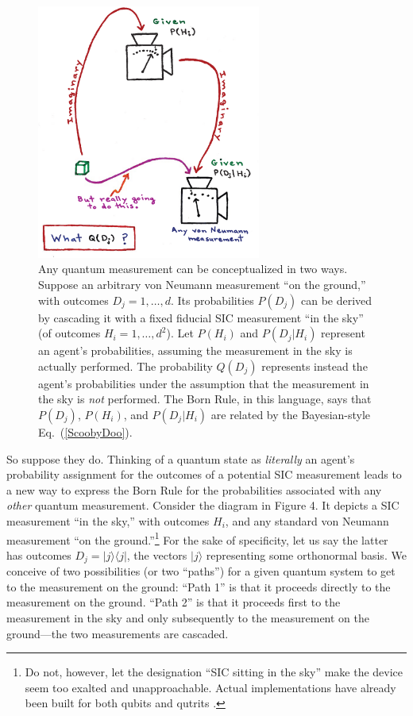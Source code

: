 \begin{figure}
\begin{center}
\includegraphics[height=3.3in]{diagram-new.eps}
\bigskip\caption{\small Any quantum measurement can be conceptualized in two ways.
Suppose an arbitrary von Neumann measurement ``on the ground,'' with outcomes $D_j=1,\ldots,d$. Its probabilities $P(D_j)$ can be derived by cascading it with a fixed fiducial SIC measurement ``in the sky'' (of outcomes $H_i=1,\ldots,d^2$). Let $P(H_i)$ and $P(D_j|H_i)$ represent an agent's probabilities, assuming the measurement in the sky is actually performed. The probability $Q(D_j)$ represents instead the agent's probabilities under the assumption that the measurement in the sky is {\it not\/} performed. The Born Rule, in this language, says that $P(D_j)$, $P(H_i)$, and $P(D_j|H_i)$ are related by the Bayesian-style Eq.~(\ref{ScoobyDoo}).}
\end{center}
\end{figure}

So suppose they do.  Thinking of a quantum state as {\it literally\/} an agent's probability assignment for the outcomes of a potential SIC measurement leads to a new way to express the Born Rule for the probabilities associated with any {\it other\/} quantum measurement.  Consider the diagram in Figure 4.  It depicts a SIC measurement ``in the sky,'' with outcomes $H_i$, and any standard von Neumann measurement ``on the ground.''\footnote{Do not, however, let the designation ``SIC sitting in the sky'' make the device seem too exalted and unapproachable.  Actual implementations have already been built for both qubits \cite{Ling06} and qutrits \cite{Medendorp10}.}  For the sake of specificity, let us say the latter has outcomes $D_j=|j\rangle\langle j|$, the vectors $|j\rangle$ representing some orthonormal basis.  We conceive of two possibilities (or two ``paths'') for a given quantum system to get to the measurement on the ground:  ``Path 1'' is that it proceeds directly to the measurement on the ground.  ``Path 2'' is that it proceeds first to the measurement in the sky and only subsequently to the measurement on the ground---the two measurements are cascaded.


